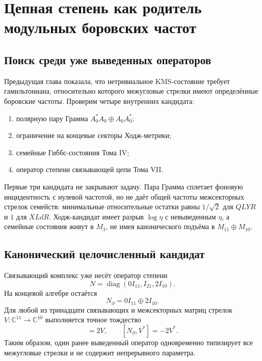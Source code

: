 \chapter{Цепная степень как родитель модульных боровских частот}
\label{ch:v8-modular-bohr-parent-origin-gate}

\section{Поиск среди уже выведенных операторов}

Предыдущая глава показала, что нетривиальное KMS-состояние требует
гамильтониана, относительно которого межугловые стрелки имеют определённые
боровские частоты. Проверим четыре внутренних кандидата:
\begin{enumerate}
 \item полярную пару Грамма $A_0^*A_0\oplus A_0A_0^*$;
 \item ограничение на концевые секторы Ходж-метрики;
 \item семейные Гиббс-состояния Тома IV;
 \item оператор степени связывающей цепи Тома VII.
\end{enumerate}

Первые три кандидата не закрывают задачу. Пара Грамма сплетает фоновую
инцидентность с нулевой частотой, но не даёт общей частоты межсекторных стрелок
семейств: минимальные относительные остатки равны $1/\sqrt2$ для $QLYR$ и
$1$ для $XLdR$. Ходж-кандидат имеет разрыв $\log\eta$ с невыведенным
$\eta$, а семейные состояния живут в $M_3$, не имея канонического подъёма
в $M_{11}\oplus M_{10}$.

\section{Канонический целочисленный кандидат}

Связывающий комплекс уже несёт оператор степени
\begin{equation}
 N=\operatorname{diag}(0I_{11},I_{21},2I_{10}).
 \label{eq:v8-chain-number-full}
\end{equation}
На концевой алгебре остаётся
\begin{equation}
 N_{\partial}=0I_{11}\oplus2I_{10}.
 \label{eq:v8-chain-number-endpoint}
\end{equation}
Для любой из тринадцати связывающих и межсекторных матриц стрелок
$V:\mathbb C^{11}\to\mathbb C^{10}$ выполняется точное тождество
\begin{equation}
 [N_{\partial},V]=2V,
 \qquad
 [N_{\partial},V^*]=-2V^*.
 \label{eq:v8-chain-number-bohr-pair}
\end{equation}
Таким образом, один ранее выведенный оператор одновременно типизирует все
межугловые стрелки и не содержит непрерывного параметра.

